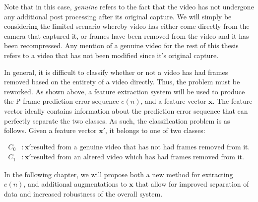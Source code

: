 Note that in this case, \emph{genuine} refers to the fact that the video has not undergone any additional post processing after its original capture. We will simply be considering the limited scenario whereby video has either come directly from the camera that captured it, or frames have been removed from the video and it has been recompressed. Any mention of a genuine video for the rest of this thesis refers to a video that has not been modified since it's original capture.

In general, it is difficult to classify whether or not a video has had frames removed based on the entirety of a video directly. Thus, the problem must be reworked. As shown above, a feature extraction system will be used to produce the P-frame prediction error sequence $e(n)$, and a feature vector $\bm{x}$. The feature vector ideally contains information about the prediction error sequence that can perfectly separate the two classes. As such, the classification problem is as follows. Given a feature vector $\bm{x}'$, it belongs to one of two classes:

\begin{equation}
\begin{aligned}
  C_{0} &: \bm{x}' \text{resulted from a genuine video that has not had frames removed from it.} \\
  C_{1} &: \bm{x}' \text{resulted from an altered video which has had frames removed from it.}
\end{aligned}
\end{equation}

In the following chapter, we will propose both a new method for extracting $e(n)$, and additional augmentations to $\bm{x}$ that allow for improved separation of data and increased robustness of the overall system.

